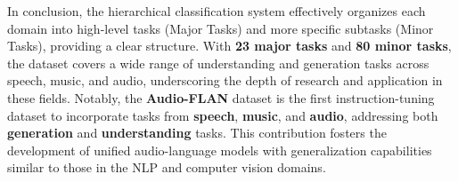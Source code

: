 


In conclusion, the hierarchical classification system effectively organizes each domain into high-level tasks (Major Tasks) and more specific subtasks (Minor Tasks), providing a clear structure. With \textbf{23 major tasks} and \textbf{80 minor tasks}, the dataset covers a wide range of understanding and generation tasks across speech, music, and audio, underscoring the depth of research and application in these fields. Notably, the \textbf{Audio-FLAN} dataset is the first instruction-tuning dataset to incorporate tasks from \textbf{speech}, \textbf{music}, and \textbf{audio}, addressing both \textbf{generation} and \textbf{understanding} tasks. This contribution fosters the development of unified audio-language models with generalization capabilities similar to those in the NLP and computer vision domains.





